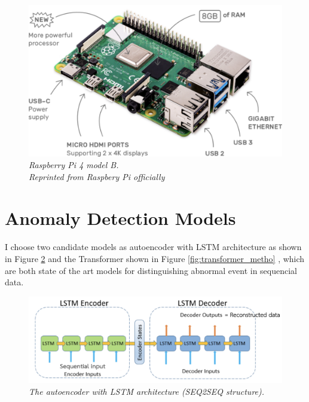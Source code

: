 \begin{figure}[H]
  \centering
  \caption[Raspberry Pi 4 model B.]{\emph{Raspberry Pi 4 model B. \\ Reprinted from Raspbery Pi officially}}\label{fig:pi4}
  \includegraphics[scale = 0.14]{figures/pi4.jpg}  
\end{figure}

\section{Anomaly Detection Models}
\paragraph{}
I choose two candidate models as autoencoder with LSTM architecture as shown in Figure \ref{fig:LSTM_metho} and the Transformer shown in Figure \ref{fig:transformer_metho} , which are both state of the art models for distinguishing abnormal event in sequencial data.

\begin{figure}[H]
  \centering
  \caption[The autoencoder with LSTM architecture (seq2seq structure).]{\emph{The autoencoder with LSTM architecture (SEQ2SEQ structure).}}\label{fig:LSTM_metho}
  \includegraphics[scale = 0.3]{figures/LSTM_metho.jpg}  
\end{figure}

